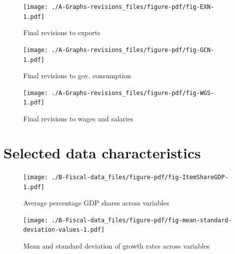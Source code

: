 \documentclass[
  letterpaper,
  authoryear,
  preprint,
  3p]{elsarticle}
\begin{document}
\pagebreak

\begin{figure}[H]

{\centering \texttt{[image: ./A-Graphs-revisions\_files/figure-pdf/fig-EXN-1.pdf]}

}

\caption{\label{fig-EXN}Final revisions to exports}

\end{figure}

\pagebreak

\begin{figure}[H]

{\centering \texttt{[image: ./A-Graphs-revisions\_files/figure-pdf/fig-GCN-1.pdf]}

}

\caption{\label{fig-GCN}Final revisions to gov. consumption}

\end{figure}

\pagebreak

\begin{figure}[H]

{\centering \texttt{[image: ./A-Graphs-revisions\_files/figure-pdf/fig-WGS-1.pdf]}

}

\caption{\label{fig-WGS}Final revisions to wages and salaries}

\end{figure}

\hypertarget{sec-fiscal-data-characteristics}{%
\chapter{Selected data
characteristics}\label{sec-fiscal-data-characteristics}}

\begin{figure}[H]

{\centering \texttt{[image: ./B-Fiscal-data\_files/figure-pdf/fig-ItemShareGDP-1.pdf]}

}

\caption{\label{fig-ItemShareGDP}Average percentage GDP shares across
variables}

\end{figure}

\begin{figure}[H]

{\centering \texttt{[image: ./B-Fiscal-data\_files/figure-pdf/fig-mean-standard-deviation-values-1.pdf]}

}

\caption{\label{fig-mean-standard-deviation-values}Mean and standard
deviation of growth rates across variables}

\end{figure}
\end{document}
